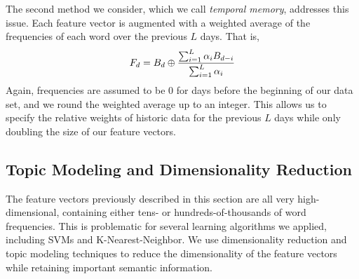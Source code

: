 \documentclass[10pt, twocolumn]{article}
\begin{document}
The second method we consider, which we call \textit{temporal memory}, addresses this issue. Each feature vector is augmented with a weighted average of the frequencies of each word over the previous $L$ days. That is, $$\displaystyle F_{d} = B_{d} \oplus {{\sum^L_{i=1}{\alpha_i B_{d-i}}} \over {\sum^L_{i=1}{\alpha_i}}}$$ Again, frequencies are assumed to be 0 for days before the beginning of our data set, and we round the weighted average up to an integer. This allows us to specify the relative weights of historic data for the previous $L$ days while only doubling the size of our feature vectors. 

\subsection{Topic Modeling and Dimensionality Reduction}
\label{sec:topicmodel}

The feature vectors previously described in this section are all very high-dimensional, containing either tens- or hundreds-of-thousands of word frequencies. This is problematic for several learning algorithms we applied, including SVMs and K-Nearest-Neighbor. We use dimensionality reduction and topic modeling techniques to reduce the dimensionality of the feature vectors while retaining important semantic information.
\end{document}
